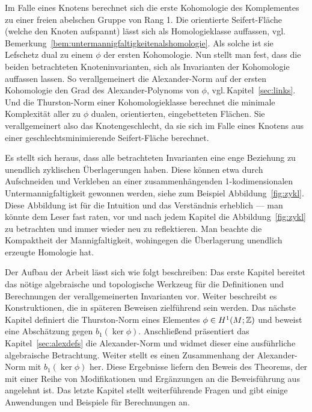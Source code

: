     Im Falle eines Knotens berechnet sich die erste Kohomologie des Komplementes zu einer freien abelschen Gruppe von Rang 1. Die orientierte Seifert-Fläche (welche den Knoten aufspannt) lässt sich als Homologieklasse auffassen, vgl.\,Bemerkung~\ref{bem:untermannigfaltigkeitenalshomologie}. Als solche ist sie Lefschetz dual zu einem $\phi$ der ersten Kohomologie. Nun stellt man fest, dass die beiden betrachteten Knoteninvarianten, sich als Invarianten der Kohomologie auffassen lassen. So verallgemeinert die Alexander-Norm auf der ersten Kohomologie den Grad des Alexander-Polynoms von $\phi$, vgl.\,Kapitel~\ref{sec:links}. Und die Thurston-Norm einer Kohomologieklasse berechnet die minimale Komplexität aller zu $\phi$ dualen, orientierten, eingebetteten Flächen. Sie verallgemeinert also das Knotengeschlecht, da sie sich im Falle eines Knotens aus einer geschlechtsminimierende Seifert-Fläche berechnet.

    Es stellt sich heraus, dass alle betrachteten Invarianten eine enge Beziehung zu unendlich zyklischen Überlagerungen haben. Diese können etwa durch Aufschneiden und Verkleben an einer zusammenhängenden 1-kodimensionalen Untermannigfaltigkeit gewonnen werden, siehe zum Beispiel Abbildung~\ref{fig:zykl}. Diese Abbildung ist für die Intuition und das Verständnis erheblich --- man könnte dem Leser fast raten, vor und nach jedem Kapitel die Abbildung~\ref{fig:zykl} zu betrachten und immer wieder neu zu reflektieren. Man beachte die Kompaktheit der Mannigfaltigkeit, wohingegen die Überlagerung unendlich erzeugte Homologie hat.

    Der Aufbau der Arbeit lässt sich wie folgt beschreiben: Das erste Kapitel bereitet das nötige algebraische und topologische Werkzeug für die Definitionen und Berechnungen der verallgemeinerten Invarianten vor. Weiter beschreibt es Konstruktionen, die in späteren Beweisen zielführend sein werden. Das nächste Kapitel definiert die Thurston-Norm eines Elementes $\phi \in H^1(M;\mathbb{Z})$ und beweist eine Abschätzung gegen $b_1(\ker\phi)$. Anschließend präsentiert das Kapitel~\ref{sec:alexdefs} die Alexander-Norm und widmet dieser eine ausführliche algebraische Betrachtung. Weiter stellt es einen Zusammenhang der Alexander-Norm mit $b_1(\ker\phi)$ her. Diese Ergebnisse liefern den Beweis des Theorems, der mit einer Reihe von Modifikationen und Ergänzungen an die Beweisführung aus~\cite{MCMULLEN.2002} angelehnt ist. Das letzte Kapitel stellt weiterführende Fragen und gibt einige Anwendungen und Beispiele für Berechnungen an.   

